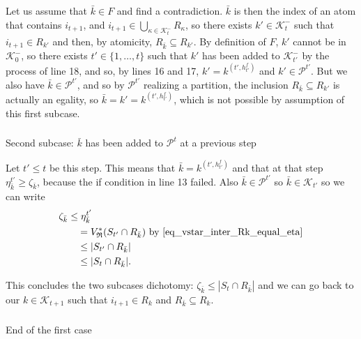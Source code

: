 \documentclass[
  11pt,
  a4paper,
]{article}
\makeatletter
\let\oldsubparagraph\subparagraph
\renewcommand{\subparagraph}{
    \@ifstar
      \xxxSubParagraphStar
      \xxxSubParagraphNoStar
  }
\newcommand{\xxxSubParagraphStar}[1]{\oldsubparagraph*{#1}\mbox{}}
\newcommand{\xxxSubParagraphNoStar}[1]{\oldsubparagraph{#1}\mbox{}}
\theoremstyle{plain}
\theoremstyle{plain}
\theoremstyle{definition}
\theoremstyle{plain}
\theoremstyle{definition}
\theoremstyle{remark}
\makeatother
\begin{document}
Let us assume that \(\bar k\in F\) and find a contradiction. \(\bar k\)
is then the index of an atom that contains \(i_{t+1}\), and
\(i_{t+1}\in\bigcup_{\kappa\in\mathcal{K}^-_{t}}R_{\kappa}\), so there
exists \(k'\in\mathcal{K}^-_{t}\) such that \(i_{t+1}\in R_{k'}\) and
then, by atomicity, \(R_{\bar k}\subseteq R_{k'}\). By definition of
\(F\), \(k'\) cannot be in \(\mathcal{K}_0^-\), so there exists
\(t'\in\{1,\dotsc,t\}\) such that \(k'\) has been added to
\(\mathcal{K}^-_{t'}\) by the process of line 18, and so, by lines 16
and 17, \(k'=k^{(t',h^f_{t'})}\) and \(k'\in\mathcal{P}^{t'}\). But we
also have \(\bar k\in\mathcal{P}^{t'}\), and so by \(\mathcal{P}^{t'}\)
realizing a partition, the inclusion \(R_{\bar k}\subseteq R_{k'}\) is
actually an egality, so \(\bar k = k' = k^{(t',h^f_{t'})}\), which is
not possible by assumption of this first subcase.

\subparagraph{\texorpdfstring{Second subcase: \(\bar k\) has been added
to \(\mathcal{P}^t\) at a previous
step}{Second subcase: \textbackslash bar k has been added to \textbackslash mathcal\{P\}\^{}t at a previous step}}\label{second-subcase-bar-k-has-been-added-to-mathcalpt-at-a-previous-step}

Let \(t'\leq t\) be this step. This means that
\(\bar k = k^{(t',h^f_{t'})}\) and that at that step
\(\eta^{t'}_{\bar k}\geq \zeta_{\bar k}\), because the if condition in
line 13 failed. Also \(\bar k\in \mathcal{P}^{t'}\) so
\(\bar k\in \mathcal{K}_{t'}\) so we can write \begin{align*}
\zeta_{\bar k}&\leq\eta^{t'}_{\bar k}\\
&\quad=V^*_{\mathfrak{R}}(S_{t'}\cap R_{\bar k})  \text{ by~\eqref{eq_vstar_inter_Rk_equal_eta}} \\
&\quad\leq | S_{t'}\cap R_{\bar k} |\\
&\quad\leq  | S_{t}\cap R_{\bar k} |.\\
\end{align*}

This concludes the two subcases dichotomy:
\(\zeta_{\bar k}\leq |S_t\cap R_{\bar k}|\) and we can go back to our
\(k\in\mathcal{K}_{t+1}\) such that \(i_{t+1}\in R_k\) and
\(R_{\bar k}\subseteq R_k\).

\subparagraph{End of the first case}\label{end-of-the-first-case}
\end{document}
